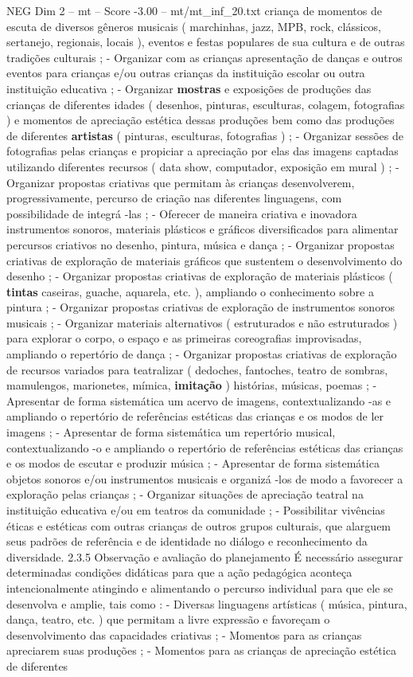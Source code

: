 \begin{textsample}{NEG Dim 2 – mt – Score -3.00 – mt/mt\_inf\_20.txt}
criança de momentos de escuta de diversos gêneros musicais ( marchinhas, jazz, MPB, rock, clássicos, sertanejo, regionais, locais ), eventos e festas populares de sua cultura e de outras tradições culturais ; - Organizar com as crianças apresentação de danças e outros eventos para crianças e/ou outras crianças da instituição escolar ou outra instituição educativa ; - Organizar \textbf{mostras} e exposições de produções das crianças de diferentes idades ( desenhos, pinturas, esculturas, colagem, fotografias ) e momentos de apreciação estética dessas produções bem como das produções de diferentes \textbf{artistas} ( pinturas, esculturas, fotografias ) ; - Organizar sessões de fotografias pelas crianças e propiciar a apreciação por elas das imagens captadas utilizando diferentes recursos ( data show, computador, exposição em mural ) ; - Organizar propostas criativas que permitam às crianças desenvolverem, progressivamente, percurso de criação nas diferentes linguagens, com possibilidade de integrá -las ; - Oferecer de maneira criativa e inovadora instrumentos sonoros, materiais plásticos e gráficos diversificados para alimentar percursos criativos no desenho, pintura, música e dança ; - Organizar propostas criativas de exploração de materiais gráficos que sustentem o desenvolvimento do desenho ; - Organizar propostas criativas de exploração de materiais plásticos ( \textbf{tintas} caseiras, guache, aquarela, etc. ), ampliando o conhecimento sobre a pintura ; - Organizar propostas criativas de exploração de instrumentos sonoros musicais ; - Organizar materiais alternativos ( estruturados e não estruturados ) para explorar o corpo, o espaço e as primeiras coreografias improvisadas, ampliando o repertório de dança ; - Organizar propostas criativas de exploração de recursos variados para teatralizar ( dedoches, fantoches, teatro de sombras, mamulengos, marionetes, mímica, \textbf{imitação} ) histórias, músicas, poemas ; - Apresentar de forma sistemática um acervo de imagens, contextualizando -as e ampliando o repertório de referências estéticas das crianças e os modos de ler imagens ; - Apresentar de forma sistemática um repertório musical, contextualizando -o e ampliando o repertório de referências estéticas das crianças e os modos de escutar e produzir música ; - Apresentar de forma sistemática objetos sonoros e/ou instrumentos musicais e organizá -los de modo a favorecer a exploração pelas crianças ; - Organizar situações de apreciação teatral na instituição educativa e/ou em teatros da comunidade ; - Possibilitar vivências éticas e estéticas com outras crianças de outros grupos culturais, que alarguem seus padrões de referência e de identidade no diálogo e reconhecimento da diversidade. 2.3.5 Observação e avaliação do planejamento É necessário assegurar determinadas condições didáticas para que a ação pedagógica aconteça intencionalmente atingindo e alimentando o percurso individual para que ele se desenvolva e amplie, tais como : - Diversas linguagens artísticas ( música, pintura, dança, teatro, etc. ) que permitam a livre expressão e favoreçam o desenvolvimento das capacidades criativas ; - Momentos para as crianças apreciarem suas produções ; - Momentos para as crianças de apreciação estética de diferentes 
\end{textsample}
